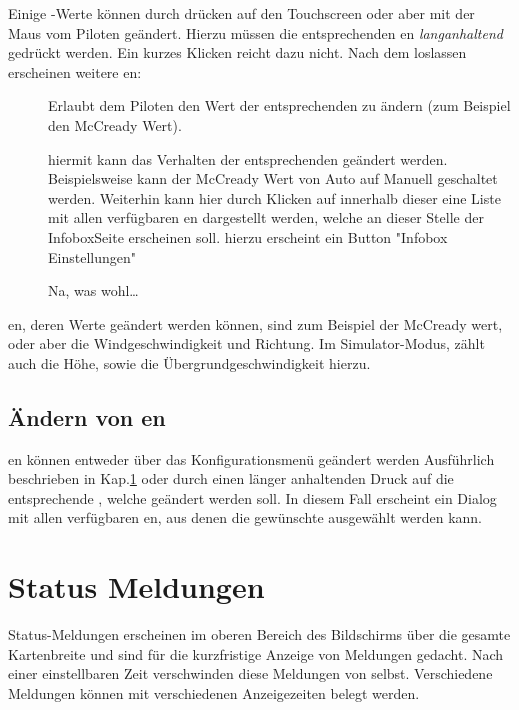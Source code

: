 Einige {\InfoBox}-Werte können durch drücken auf den Touchscreen oder aber mit der Maus vom Piloten geändert.
Hierzu müssen die entsprechenden {\InfoBox}en  \emph{langanhaltend} gedrückt werden.
Ein kurzes Klicken reicht dazu nicht.  Nach dem loslassen erscheinen weitere {\InfoBox}en:

\begin{description}
\item[]
Erlaubt dem Piloten den Wert der entsprechenden {\InfoBox} zu ändern (zum Beispiel den McCready Wert).

\item[]
hiermit kann das Verhalten der entsprechenden {\InfoBox} geändert werden. Beispielsweise kann der McCready Wert von Auto auf Manuell geschaltet werden.
Weiterhin kann hier durch Klicken auf   innerhalb dieser {\InfoBox}  eine Liste mit allen verfügbaren {\InfoBox}en dargestellt werden, welche an dieser Stelle der InfoboxSeite erscheinen soll. hierzu erscheint ein Button "Infobox Einstellungen"

\item[] Na, was wohl\dots
\end{description}

{\InfoBox}en, deren Werte geändert werden können, sind zum Beispiel der McCready wert, oder aber die Windgeschwindigkeit und Richtung. Im Simulator-Modus, zählt auch die Höhe, sowie die Übergrundgeschwindigkeit hierzu.

\subsection*{Ändern von {\InfoBox}en}
{\InfoBox}en können entweder über das Konfigurationsmenü geändert werden 
  Ausführlich beschrieben in Kap.\ref{}
oder durch einen länger anhaltenden Druck auf die entsprechende  {\InfoBox}, welche geändert werden soll.
 In diesem Fall erscheint ein Dialog mit allen verfügbaren {\InfoBox}en, aus denen die gewünschte ausgewählt werden kann.
 

\section{Status Meldungen}
Status-Meldungen erscheinen im oberen Bereich des Bildschirms über die gesamte Kartenbreite und sind für die kurzfristige Anzeige von Meldungen gedacht. Nach einer einstellbaren Zeit verschwinden diese Meldungen von selbst. Verschiedene Meldungen können mit verschiedenen Anzeigezeiten belegt werden.

